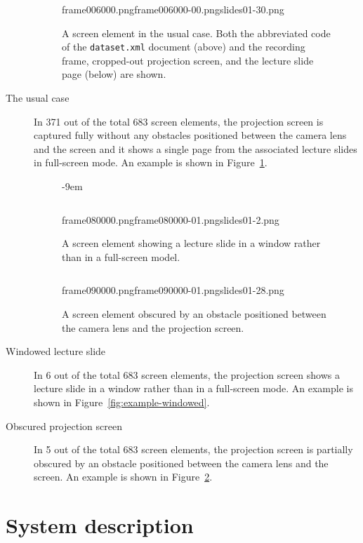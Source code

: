 \begin{description}
  \begin{figure}
    \inputminted{xml}{fig/examples/normal/example.xml}
      {frame006000.png}{frame006000-00.png}{slides01-30.png}
    \caption{A screen element in the usual case. Both the abbreviated code
      of the \texttt{dataset.xml} document (above) and the recording frame,
      cropped-out projection screen, and the lecture slide page (below) are
      shown.}
    \label{fig:example-normal}
  \end{figure}
  \item[The usual case] In 371 out of the total 683 screen elements, the
    projection screen is captured fully without any obstacles positioned
    between the camera lens and the screen and it shows a single page from the
    associated lecture slides in full-screen mode. An example is shown in
    Figure~\ref{fig:example-normal}.

  \begin{figure}[!]
    \kern-9em
    \inputminted{xml}{fig/examples/windowed/example.xml}
      {frame080000.png}{frame080000-01.png}{slides01-2.png}
    \caption{A screen element showing a lecture slide in a window rather
      than in a full-screen model.}
    \label{fig:example-windowed}

    \kern\floatsep
    \inputminted{xml}{fig/examples/obstacle/example.xml}
      {frame090000.png}{frame090000-01.png}{slides01-28.png}
    \caption{A screen element obscured by an obstacle positioned between the
      camera lens and the projection screen.}
    \label{fig:example-obstacle}
  \end{figure}
  \item[Windowed lecture slide] In 6 out of the total 683 screen elements,
    the projection screen shows a lecture slide in a window rather than in a
    full-screen mode. An example is shown in Figure~\ref{fig:example-windowed}.
  \item[Obscured projection screen] In 5 out of the total 683 screen elements,
    the projection screen is partially obscured by an obstacle positioned
    between the camera lens and the screen. An example is shown in
    Figure~\ref{fig:example-obstacle}.
\end{description}

\section{System description}
